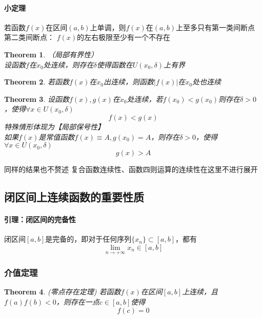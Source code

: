 \documentclass[11pt,hyperref,a4paper,UTF8]{ctexart}
\newtheorem{theorem}{Theorem}[subsection]
\begin{document}
\begin{CJK}{UTF8}{gkai}
\paragraph{小定理\\}
若函数$f(x)$在区间$(a,b)$上单调，则$f(x)$在$(a,b)$上至多只有第一类间断点\\

第二类间断点：
$f(x)$的左右极限至少有一个不存在\\
\begin{theorem}（局部有界性）\\

设函数$f$在$x_0$处连续，则存在$\delta$使得函数在$U(x_0,\delta)$上有界\\
\end{theorem}
\begin{theorem}
若函数$f(x)$在$x_0$出连续，则函数$|f(x)|$在$x_0$处也连续\\
\end{theorem}
\begin{theorem}
设函数$f(x),g(x)$在$x_0$处连续，若$f(x_0)<g(x_0)$则存在$\delta>0$，使得$\forall x\in U(x_0,\delta)$\\
\[f(x)<g(x)\] 
特殊情形体现为【局部保号性】\\
如果$f(x)$是常值函数$f(x)\equiv A,g(x_0)=A$，则存在$\delta>0$，使得$\forall x\in U(x_0,\delta)$\\
\[g(x)>A\] 
\end{theorem}
同样的结果也不赘述
复合函数连续性、函数四则运算的连续性在这里不进行展开\\
\subsection{闭区间上连续函数的重要性质}


\paragraph{引理：闭区间的完备性\\}
闭区间$[a,b]$是完备的，即对于任何序列$\{x_n\}\subset [a,b]$，都有
\[\lim_{n\to +\infty}x_n\in [a,b]\]

\subsubsection{介值定理}
\begin{theorem}(零点存在定理)
若函数$f(x)$在区间$[a,b]$上连续，且$f(a)f(b)<0$，则存在一点$c\in[a,b]$使得
\[f(c)=0\]
\end{theorem}


\end{CJK}
\end{document}
